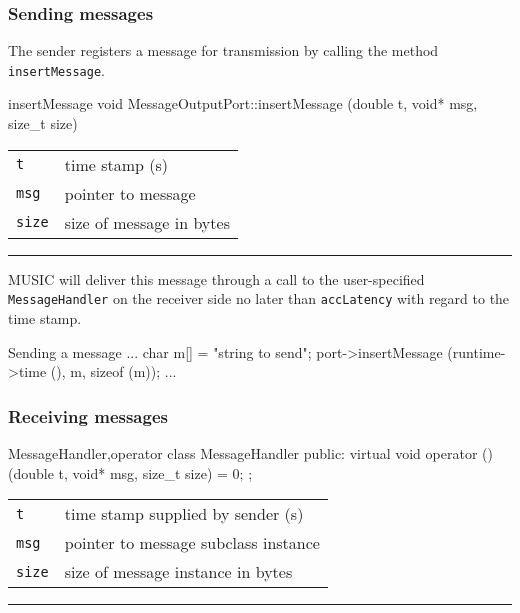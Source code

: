 \documentclass[a4paper,twoside]{report}
\makeatletter
\newenvironment{parameters}%
{\begin{tabular}{@{\hspace{2em}}lp{0.6\textwidth}}}%
{\end{tabular}\par\vspace{1mm}\par\hrule\par\vspace{5mm}}
\makeatother
\begin{document}
\subsubsection{Sending messages}

The sender registers a message for transmission by calling the method\\
\lstinline|insertMessage|.

\begin{head}{insertMessage}
  void MessageOutputPort::insertMessage (double t,
                                         void* msg,
                                         size_t size)
\end{head}
\begin{parameters}
  \lstinline|t| & time stamp (s) \\
  \lstinline|msg| & pointer to message \\
  \lstinline|size| & size of message in bytes \\
\end{parameters}

MUSIC will deliver this message through a call to the user-specified \\
\lstinline|MessageHandler| on the receiver side no later than
\lstinline|accLatency| with regard to the time stamp.

\begin{code}{Sending a message}
{
  ...
  char m[] = "string to send";
  port->insertMessage (runtime->time (), m, sizeof (m));
  ...
}
\end{code}

\pagebreak
\subsubsection{Receiving messages}

\begin{head}{MessageHandler,operator}
  class MessageHandler {
  public:
    virtual void operator () (double t,
                              void* msg,
                              size_t size) = 0;
  };
\end{head}
\begin{parameters}
  \lstinline|t| & time stamp supplied by sender (s) \\
  \lstinline|msg| & pointer to message subclass instance \\
  \lstinline|size| & size of message instance in bytes \\
\end{parameters}
\end{document}
